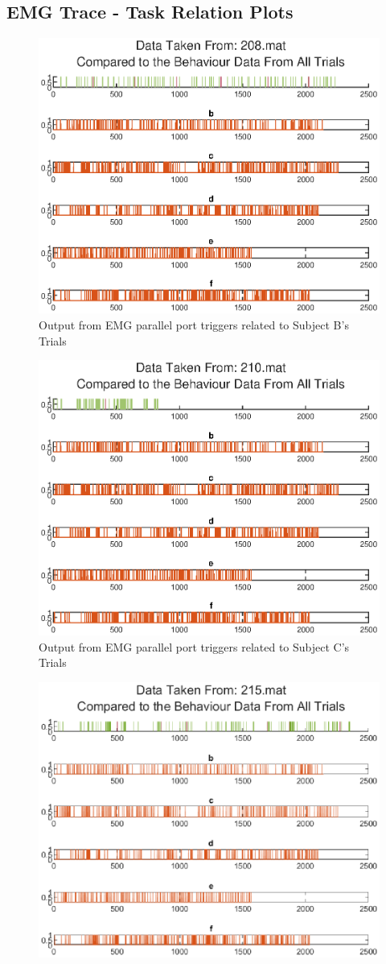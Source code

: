 \begin{appendices}
\section{EMG Trace - Task Relation Plots}
\label{appendix:ExtraResults1_2}
\begin{figure}[H]
    \centering
    \includegraphics[width=0.75\linewidth]{figures/EMG_Trigger_Comparison_b}
    \caption{Output from EMG parallel port triggers related to Subject B's Trials}
    \label{fig:EMG_Trace_B}
\end{figure}
\begin{figure}[H]
    \centering
    \includegraphics[width=0.75\linewidth]{figures/EMG_Trigger_Comparison_c}
    \caption{Output from EMG parallel port triggers related to Subject C's Trials}
    \label{fig:EMG_Trace_C}
\end{figure}
\begin{figure}[H]
    \centering
    \includegraphics[width=0.75\linewidth]{figures/EMG_Trigger_Comparison_d}

\end{figure}
\end{appendices}
